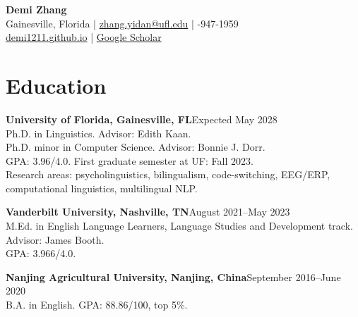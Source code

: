 \documentclass[11pt,letterpaper]{article}
\newcommand{\cvitem}[2]{\textbf{#1}\hfill #2\\}
\begin{document}
\begin{center}
{\LARGE \textbf{Demi Zhang}}\\
Gainesville, Florida \quad | \quad \href{mailto:zhang.yidan@ufl.edu}{zhang.yidan@ufl.edu} \quad | -947-1959\\
\href{https://demi1211.github.io}{demi1211.github.io} \quad | \quad \href{https://scholar.google.com/citations?user=gzqhVb4AAAAJ}{Google Scholar}
\end{center}

\section*{Education}
\cvitem{University of Florida, Gainesville, FL}{Expected May 2028}
Ph.D. in Linguistics. Advisor: Edith Kaan.\\
Ph.D. minor in Computer Science. Advisor: Bonnie J. Dorr.\\
GPA: 3.96/4.0. First graduate semester at UF: Fall 2023.\\
Research areas: psycholinguistics, bilingualism, code-switching, EEG/ERP, computational linguistics, multilingual NLP.

\cvitem{Vanderbilt University, Nashville, TN}{August 2021--May 2023}
M.Ed. in English Language Learners, Language Studies and Development track. Advisor: James Booth.\\
GPA: 3.966/4.0.

\cvitem{Nanjing Agricultural University, Nanjing, China}{September 2016--June 2020}
B.A. in English. GPA: 88.86/100, top 5\%.
\end{document}
